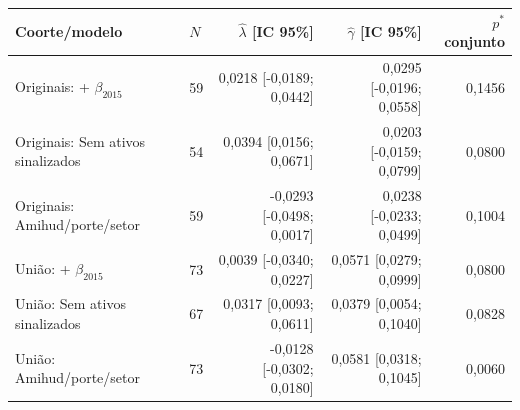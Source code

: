 \begin{tabular}{llrrr}
\toprule
Coorte/modelo & $N$ & $\widehat\lambda$ [IC 95\%] & $\widehat\gamma$ [IC 95\%] & $p^*$ conjunto\\
\midrule
Originais: + $\beta_{2015}$ & 59 & 0,0218 [-0,0189; 0,0442] & 0,0295 [-0,0196; 0,0558] & 0,1456\\
Originais: Sem ativos sinalizados & 54 & 0,0394 [0,0156; 0,0671] & 0,0203 [-0,0159; 0,0799] & 0,0800\\
Originais: Amihud/porte/setor & 59 & -0,0293 [-0,0498; 0,0017] & 0,0238 [-0,0233; 0,0499] & 0,1004\\
União: + $\beta_{2015}$ & 73 & 0,0039 [-0,0340; 0,0227] & 0,0571 [0,0279; 0,0999] & 0,0800\\
União: Sem ativos sinalizados & 67 & 0,0317 [0,0093; 0,0611] & 0,0379 [0,0054; 0,1040] & 0,0828\\
União: Amihud/porte/setor & 73 & -0,0128 [-0,0302; 0,0180] & 0,0581 [0,0318; 0,1045] & 0,0060\\
\bottomrule
\end{tabular}
